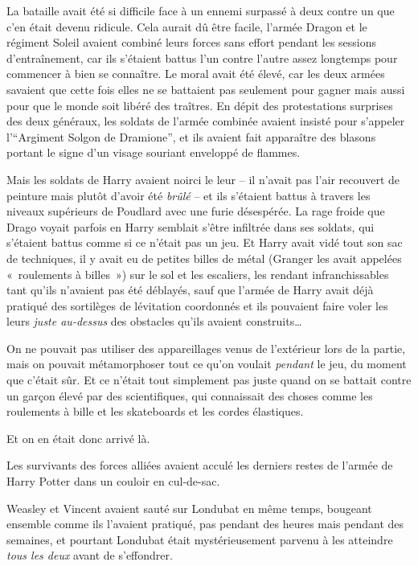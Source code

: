 La bataille avait été si difficile face à un ennemi surpassé à deux contre un que c'en était devenu ridicule.
Cela aurait dû être facile, l'armée Dragon et le régiment Soleil avaient combiné leurs forces sans effort pendant les sessions d'entraînement, car ils s'étaient battus l'un contre l'autre assez longtemps pour commencer à bien se connaître.
Le moral avait été élevé, car les deux armées savaient que cette fois elles ne se battaient pas seulement pour gagner mais aussi pour que le monde soit libéré des traîtres.
En dépit des protestations surprises des deux généraux, les soldats de l'armée combinée avaient insisté pour s'appeler l'“Argiment Solgon de Dramione”, et ils avaient fait apparaître des blasons portant le signe d'un visage souriant enveloppé de flammes.

Mais les soldats de Harry avaient noirci le leur -- il n'avait pas l'air recouvert de peinture mais plutôt d'avoir été \emph{brûlé} -- et ils s'étaient battus à travers les niveaux supérieurs de Poudlard avec une furie désespérée.
La rage froide que Drago voyait parfois en Harry semblait s'être infiltrée dans ses soldats, qui s'étaient battus comme si ce n'était pas un jeu.
Et Harry avait vidé tout son sac de techniques, il y avait eu de petites billes de métal (Granger les avait appelées «~roulements à billes~») sur le sol et les escaliers, les rendant infranchissables tant qu'ils n'avaient pas été déblayés, sauf que l'armée de Harry avait déjà pratiqué des sortilèges de lévitation coordonnés et ils pouvaient faire voler les leurs \emph{juste au-dessus} des obstacles qu'ils avaient construits…

On ne pouvait pas utiliser des appareillages venus de l'extérieur lors de la partie, mais on pouvait métamorphoser tout ce qu'on voulait \emph{pendant} le jeu, du moment que c'était sûr.
Et ce n'était tout simplement pas juste quand on se battait contre un garçon élevé par des scientifiques, qui connaissait des choses comme les roulements à bille et les skateboards et les cordes élastiques.

Et on en était donc arrivé là.

Les survivants des forces alliées avaient acculé les derniers restes de l'armée de Harry Potter dans un couloir en cul-de-sac.

Weasley et Vincent avaient sauté sur Londubat en même temps, bougeant ensemble comme ils l'avaient pratiqué, pas pendant des heures mais pendant des semaines, et pourtant Londubat était mystérieusement parvenu à les atteindre \emph{tous les deux} avant de s'effondrer.

